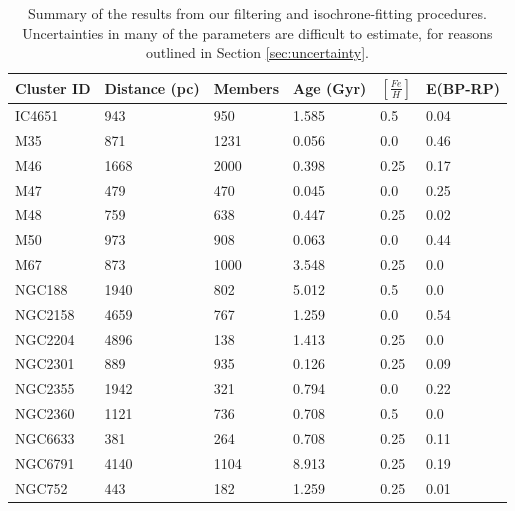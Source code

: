 \documentclass[onecolumn,table,xcdraw,super]{aastex631}
\begin{document}
\begin{table}[]
\centering
{}
\begin{tabular}{llllll}
\toprule
Cluster ID & Distance (pc) & Members & Age (Gyr) & $[\frac{Fe}{H}]$ & E(BP-RP) \\ \midrule
IC4651     & 943        & 950     & 1.585     & 0.5              & 0.04      \\
M35        & 871        & 1231    & 0.056     & 0.0              & 0.46      \\
M46        & 1668       & 2000    & 0.398     & 0.25             & 0.17      \\
M47        & 479        & 470     & 0.045     & 0.0              & 0.25      \\
M48        & 759        & 638     & 0.447     & 0.25             & 0.02      \\
M50        & 973        & 908     & 0.063     & 0.0              & 0.44      \\
M67        & 873        & 1000    & 3.548     & 0.25             & 0.0       \\
NGC188     & 1940       & 802     & 5.012     & 0.5              & 0.0       \\
NGC2158    & 4659       & 767     & 1.259     & 0.0              & 0.54      \\
NGC2204    & 4896       & 138     & 1.413     & 0.25             & 0.0       \\
NGC2301    & 889        & 935     & 0.126     & 0.25             & 0.09      \\
NGC2355    & 1942       & 321     & 0.794     & 0.0              & 0.22      \\
NGC2360    & 1121       & 736     & 0.708     & 0.5              & 0.0       \\
NGC6633    & 381        & 264     & 0.708     & 0.25             & 0.11      \\
NGC6791    & 4140       & 1104    & 8.913     & 0.25             & 0.19      \\
NGC752     & 443        & 182     & 1.259     & 0.25             & 0.01      \\ \bottomrule
\end{tabular}
\caption{Summary of the results from our filtering and isochrone-fitting procedures. Uncertainties in many of the parameters are difficult to estimate, for reasons outlined in Section \ref{sec:uncertainty}.}
\label{tab:fits}
\end{table}
\end{document}
